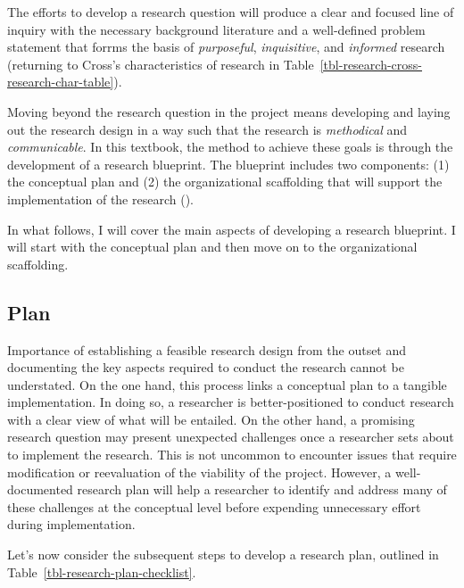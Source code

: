 \documentclass[
  letterpaper,
  krantz1]{latex/krantz-mod}
\theoremstyle{definition}
\theoremstyle{definition}
\theoremstyle{remark}
\begin{document}
The efforts to develop a research question will produce a clear and
focused line of inquiry with the necessary background literature and a
well-defined problem statement that forrms the basis of
\emph{purposeful}, \emph{inquisitive}, and \emph{informed} research
(returning to Cross's characteristics of research in
Table~\ref{tbl-research-cross-research-char-table}).

Moving beyond the research question in the project means developing and
laying out the research design in a way such that the research is
\emph{methodical} and \emph{communicable}. In this textbook, the method
to achieve these goals is through the development of a research
blueprint. The blueprint includes two components: (1) the conceptual
plan and (2) the organizational scaffolding that will support the
implementation of the research ().

In what follows, I will cover the main aspects of developing a research
blueprint. I will start with the conceptual plan and then move on to the
organizational scaffolding.

\subsection{Plan}\label{sec-research-plan}

Importance of establishing a feasible research design from the outset
and documenting the key aspects required to conduct the research cannot
be understated. On the one hand, this process links a conceptual plan to
a tangible implementation. In doing so, a researcher is
better-positioned to conduct research with a clear view of what will be
entailed. On the other hand, a promising research question may present
unexpected challenges once a researcher sets about to implement the
research. This is not uncommon to encounter issues that require
modification or reevaluation of the viability of the project. However, a
well-documented research plan will help a researcher to identify and
address many of these challenges at the conceptual level before
expending unnecessary effort during implementation.

Let's now consider the subsequent steps to develop a research plan,
outlined in Table~\ref{tbl-research-plan-checklist}.
\end{document}
